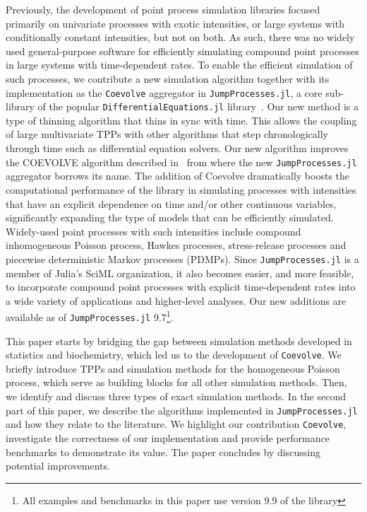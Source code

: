 \documentclass{juliacon}
\numberwithin{equation}{section}
\begin{document}
Previously, the development of point process simulation libraries focused primarily on univariate processes with exotic intensities, or large systems with conditionally constant intensities, but not on both. As such, there was no widely used general-purpose software for efficiently simulating compound point processes in large systems with time-dependent rates. To enable the efficient simulation of such processes, we contribute a new simulation algorithm together with its implementation as the \texttt{Coevolve} aggregator in \texttt{JumpProcesses.jl}, a core sub-library of the popular \texttt{DifferentialEquations.jl} library~\cite{rackauckas2017}. Our new method is a type of thinning algorithm that thins in sync with time. This allows the coupling of large multivariate TPPs with other algorithms that step chronologically through time such as differential equation solvers. Our new algorithm improves the COEVOLVE algorithm described in~\cite{farajtabar2017} from where the new \texttt{JumpProcesses.jl} aggregator borrows its name. The addition of Coevolve dramatically boosts the computational performance of the library in simulating processes with intensities that have an explicit dependence on time and/or other continuous variables,  significantly expanding the type of models that can be efficiently simulated. Widely-used point processes with such intensities include compound inhomogeneous Poisson process, Hawkes processes, stress-release processes and piecewise deterministic Markov processes (PDMPs). Since \texttt{JumpProcesses.jl} is a member of Julia's SciML organization, it also becomes easier, and more feasible, to incorporate compound point processes with explicit time-dependent rates into a wide variety of applications and higher-level analyses. Our new additions are available as of \texttt{JumpProcesses.jl} 9.7\footnote{All examples and benchmarks in this paper use version 9.9 of the library}.

This paper starts by bridging the gap between simulation methods developed in statistics and biochemistry, which led us to the development of \texttt{Coevolve}. We briefly introduce TPPs and simulation methods for the homogeneous Poisson process, which serve as building blocks for all other simulation methods. Then, we identify and discuss three types of exact simulation methods. In the second part of this paper, we describe the algorithms implemented in \texttt{JumpProcesses.jl} and how they relate to the literature. We highlight our contribution \texttt{Coevolve}, investigate the correctness of our implementation and provide performance benchmarks to demonstrate its value. The paper concludes by discussing potential improvements.
\end{document}
